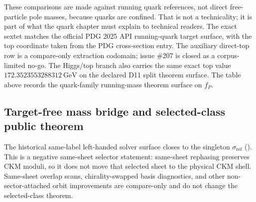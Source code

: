 \documentclass[11pt]{article}
\newcommand{\ophid}[1]{\path{#1}}
\begin{document}
These comparisons are made against running quark references, not direct free-particle pole
masses, because quarks are confined. That is not a technicality; it is part of what the quark
chapter must explain to technical readers. The exact sextet matches the official PDG 2025 API
running-quark target surface, with the top coordinate taken from the PDG cross-section entry. The
auxiliary direct-top row is a compare-only extraction codomain; issue \#207 is closed as a corpus-limited no-go. The Higgs/top branch also carries the same exact
top value \(172.3523553288312~\mathrm{GeV}\) on the declared D11 split theorem surface. The table above
records the quark-family running-mass theorem surface on \(f_P\).

\subsection{Target-free mass bridge and selected-class public theorem}\label{quark-family-strongest-overlap-branch-primitives}

The historical same-label left-handed solver surface closes to the singleton
\(\sigma_{\mathrm{ref}}\) (\ophid{sigma_ref}). This is a negative same-sheet selector statement:
same-sheet rephasing preserves CKM moduli, so it does not move that selected sheet to the
physical CKM shell. Same-sheet overlap scans, chirality-swapped basis diagnostics, and other
non-sector-attached orbit improvements are compare-only and do not change the selected-class
theorem.
\end{document}
